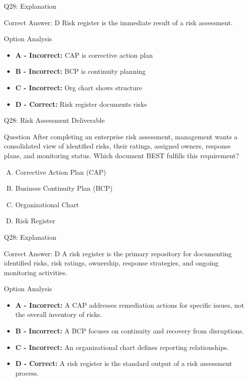 \documentclass{beamer}
\begin{document}
	\begin{frame}{Q28: Explanation}
		\begin{block}{Correct Answer: D}
			Risk register is the immediate result of a risk assessment.
		\end{block}
		\begin{block}{Option Analysis}
			\begin{itemize}
				\item \textbf{A - Incorrect:} CAP is corrective action plan
				\item \textbf{B - Incorrect:} BCP is continuity planning
				\item \textbf{C - Incorrect:} Org chart shows structure
				\item \textbf{D - Correct:} Risk register documents risks
			\end{itemize}
		\end{block}
	\end{frame}
	
	\begin{frame}{Q28: Risk Assessment Deliverable} \begin{block}{Question} After completing an enterprise risk assessment, management wants a consolidated view of identified risks, their ratings, assigned owners, response plans, and monitoring status. Which document BEST fulfills this requirement? \end{block} \begin{enumerate}[(A)] \item Corrective Action Plan (CAP) \item Business Continuity Plan (BCP) \item Organizational Chart \item Risk Register \end{enumerate} \end{frame} \begin{frame}{Q28: Explanation} \begin{block}{Correct Answer: D} A risk register is the primary repository for documenting identified risks, risk ratings, ownership, response strategies, and ongoing monitoring activities. \end{block} \begin{block}{Option Analysis} \begin{itemize} \item \textbf{A - Incorrect:} A CAP addresses remediation actions for specific issues, not the overall inventory of risks. \item \textbf{B - Incorrect:} A BCP focuses on continuity and recovery from disruptions. \item \textbf{C - Incorrect:} An organizational chart defines reporting relationships. \item \textbf{D - Correct:} A risk register is the standard output of a risk assessment process. \end{itemize} \end{block} \end{frame}
	
\end{document}
